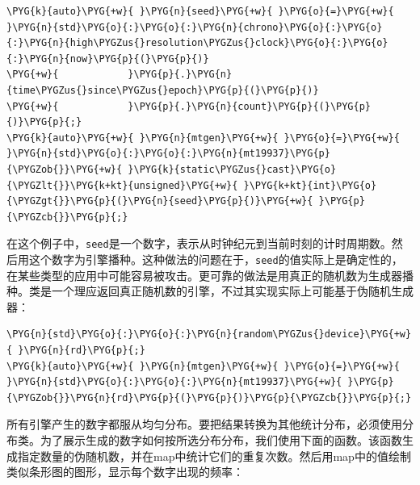 \begin{codeblockbg}
\begin{Verbatim}[commandchars=\\\{\},breaklines=true,breakanywhere=true,fontsize=\codefont,xleftmargin=17bp]
\PYG{k}{auto}\PYG{+w}{ }\PYG{n}{seed}\PYG{+w}{ }\PYG{o}{=}\PYG{+w}{ }\PYG{n}{std}\PYG{o}{:}\PYG{o}{:}\PYG{n}{chrono}\PYG{o}{:}\PYG{o}{:}\PYG{n}{high\PYGZus{}resolution\PYGZus{}clock}\PYG{o}{:}\PYG{o}{:}\PYG{n}{now}\PYG{p}{(}\PYG{p}{)}
\PYG{+w}{            }\PYG{p}{.}\PYG{n}{time\PYGZus{}since\PYGZus{}epoch}\PYG{p}{(}\PYG{p}{)}
\PYG{+w}{            }\PYG{p}{.}\PYG{n}{count}\PYG{p}{(}\PYG{p}{)}\PYG{p}{;}
\PYG{k}{auto}\PYG{+w}{ }\PYG{n}{mtgen}\PYG{+w}{ }\PYG{o}{=}\PYG{+w}{ }\PYG{n}{std}\PYG{o}{:}\PYG{o}{:}\PYG{n}{mt19937}\PYG{p}{\PYGZob{}}\PYG{+w}{ }\PYG{k}{static\PYGZus{}cast}\PYG{o}{\PYGZlt{}}\PYG{k+kt}{unsigned}\PYG{+w}{ }\PYG{k+kt}{int}\PYG{o}{\PYGZgt{}}\PYG{p}{(}\PYG{n}{seed}\PYG{p}{)}\PYG{+w}{ }\PYG{p}{\PYGZcb{}}\PYG{p}{;}
\end{Verbatim}
\end{codeblockbg}



在这个例子中，\texttt{seed}是一个数字，表示从时钟纪元到当前时刻的计时周期数。然后用这个数字为引擎播种。这种做法的问题在于，\texttt{seed}的值实际上是确定性的，在某些类型的应用中可能容易被攻击。更可靠的做法是用真正的随机数为生成器播种。类是一个理应返回真正随机数的引擎，不过其实现实际上可能基于伪随机生成器：



\begin{codeblockbg}
\begin{Verbatim}[commandchars=\\\{\},breaklines=true,breakanywhere=true,fontsize=\codefont,xleftmargin=17bp]
\PYG{n}{std}\PYG{o}{:}\PYG{o}{:}\PYG{n}{random\PYGZus{}device}\PYG{+w}{ }\PYG{n}{rd}\PYG{p}{;}
\PYG{k}{auto}\PYG{+w}{ }\PYG{n}{mtgen}\PYG{+w}{ }\PYG{o}{=}\PYG{+w}{ }\PYG{n}{std}\PYG{o}{:}\PYG{o}{:}\PYG{n}{mt19937}\PYG{+w}{ }\PYG{p}{\PYGZob{}}\PYG{n}{rd}\PYG{p}{(}\PYG{p}{)}\PYG{p}{\PYGZcb{}}\PYG{p}{;}
\end{Verbatim}
\end{codeblockbg}



所有引擎产生的数字都服从均匀分布。要把结果转换为其他统计分布，必须使用分布类。为了展示生成的数字如何按所选分布分布，我们使用下面的函数。该函数生成指定数量的伪随机数，并在map中统计它们的重复次数。然后用map中的值绘制类似条形图的图形，显示每个数字出现的频率：


